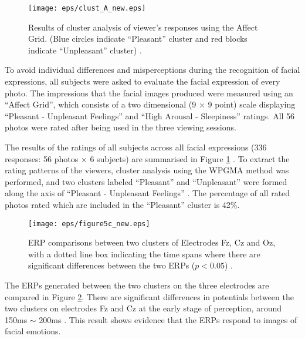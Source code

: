 \documentclass[fonts]{icst}
\begin{document}
\begin{figure}[tb]
   \begin{center}
    \texttt{[image: eps/clust\_A\_new.eps]}
   \end{center}
  \caption{Results of cluster analysis of viewer's responses using the
 Affect Grid. (Blue circles indicate ``Pleasant'' cluster and red blocks indicate
 ``Unpleasant'' cluster) \cite{yasuda15}. }
  \label{fig:culst_A}
\end{figure}

To avoid individual differences and misperceptions during the
recognition of facial expressions, all subjects were asked to evaluate
the facial expression of every photo.
The impressions that the facial images produced were measured using an 
``Affect Grid'', which consists of a two dimensional 
(9 $\times$ 9 point) scale displaying 
``Pleasant - Unpleasant Feelings'' and ``High Arousal - Sleepiness'' ratings.
All 56 photos were rated after being used in the three viewing sessions. 

The results of the ratings of all subjects across all facial expressions 
(336 responses: 56 photos $\times$ 6 subjects) are summarised in Figure
\ref{fig:culst_A} \cite{minoru19}. 
To extract the rating patterns of the viewers, cluster analysis using the
WPGMA method was performed, and two clusters labeled ``Pleasant'' and
``Unpleasant'' were formed along the axis of ``Pleasant - Unpleasant
Feelings'' \cite{yasuda15}. 
The percentage of all rated photos rated which are included in the
``Pleasant'' cluster is 42\%.

\begin{figure}[tb]
   \begin{center}
    \texttt{[image: eps/figure5c\_new.eps]}
   \end{center}
  \caption{ERP comparisons between two clusters of Electrodes Fz, Cz and
 Oz, with a dotted line box indicating the time spans where there are
 significant differences between the two ERPs ($p<0.05$) \cite{yasuda15}.}
  \label{fig:5}
\end{figure}

The ERPs generated between the two clusters on the three electrodes are
compared in Figure \ref{fig:5}.  
There are significant differences in potentials between the two clusters
on electrodes Fz and Cz at the early stage of perception, around 150ms
$\sim$ 200ms \cite{minoru19}. 
This result shows evidence that the ERPs respond to images of facial
emotions. 
\end{document}
